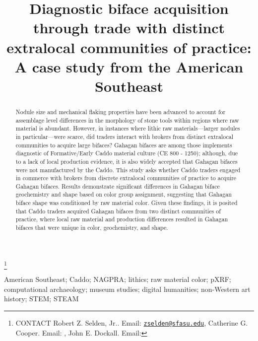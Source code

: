 \documentclass[]{interact}
\theoremstyle{plain}%
\theoremstyle{definition}
\theoremstyle{remark}
\begin{document}

\title{Diagnostic biface acquisition through trade with distinct
extralocal communities of practice: A case study from the American
Southeast}


\author{
}

\thanks{CONTACT Robert Z. Selden,
Jr.. Email: \href{mailto:zselden@sfasu.edu}{\nolinkurl{zselden@sfasu.edu}}, Catherine
G. Cooper. Email: , John E. Dockall. Email: }

\maketitle

\begin{abstract}
Nodule size and mechanical flaking properties have been advanced to
account for assemblage level differences in the morphology of stone
tools within regions where raw material is abundant. However, in
instances where lithic raw materials---larger nodules in
particular---were scarce, did traders interact with brokers from
distinct extralocal communities to acquire large bifaces? Gahagan
bifaces are among those implements diagnostic of Formative/Early Caddo
material culture (CE 800 - 1250); although, due to a lack of local
production evidence, it is also widely accepted that Gahagan bifaces
were not manufactured by the Caddo. This study asks whether Caddo
traders engaged in commerce with brokers from discrete extralocal
communities of practice to acquire Gahagan bifaces. Results demonstrate
significant differences in Gahagan biface geochemistry and shape based
on color group assignment, suggesting that Gahagan biface shape was
conditioned by raw material color. Given these findings, it is posited
that Caddo traders acquired Gahagan bifaces from two distinct
communities of practice, where local raw material and production
differences resulted in Gahagan bifaces that were unique in color,
geochemistry, and shape.
\end{abstract}

\begin{keywords}
American Southeast; Caddo; NAGPRA; lithics; raw material color; pXRF;
computational archaeology; museum studies; digital humanities;
non-Western art history; STEM; STEAM
\end{keywords}
\end{document}
